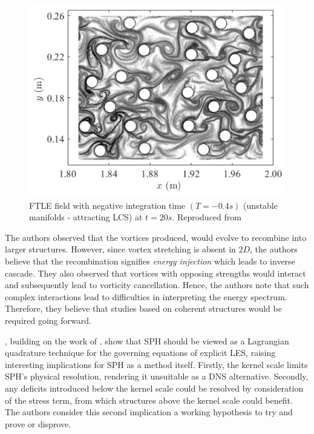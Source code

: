 \begin{figure}[H]
    \centering
    \includegraphics{Figures/research_papers/Canelas2016-ftle-field.png}
    \caption{FTLE field with negative integration time $(T = -0.4 s)$ (unstable manifolds - attracting LCS) at $t = 20s$. Reproduced from \cite{Canelas2016}}
    \label{fig:Canelas2016-ftle-field}
\end{figure}

The authors observed that the vortices produced, would evolve to recombine into larger structures. However, since vortex stretching is absent in $2D$, the authors believe that the recombination signifies \textit{energy injection} which leads to inverse cascade. They also observed that vortices with opposing strengths would interact and subsequently lead to vorticity cancellation. Hence, the authors note that such complex interactions lead to difficulties in interpreting the energy spectrum. Therefore, they believe that studies based on coherent structures would be required going forward.

\cite{Okraschevski2022}, building on the work of \cite{hardy1982formulas}, show that SPH should be viewed as a Lagrangian quadrature technique for the governing equations of explicit LES, raising interesting implications for SPH as a method itself. Firstly, the kernel scale limits SPH’s physical resolution, rendering it unsuitable as a DNS alternative. Secondly, any deficits introduced below the kernel scale could be resolved by consideration of the stress term, from which structures above the kernel scale could benefit. The authors consider this second implication a working hypothesis to try and prove or disprove.

